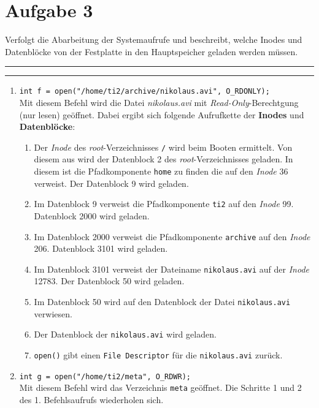 \documentclass{ti2}
\makeatletter
\renewenvironment{quote}{%
  \vskip 10\p@
  \parindent\z@
  \tcolorbox[
    breakable, sharp corners,
    boxrule=\z@, boxsep=\z@,
    left=\z@, right=\z@,
    top=\z@, bottom=\z@,
    colback=sx-yellow
  ]
  {\color{sx-orange}\d@ublerule}
  \vskip 5\p@
  \list{}{\rightmargin\leftmargin}%
  \item\relax
}{%
  \endlist
  {\color{sx-orange}\d@ublerule}
  \endtcolorbox
  \vskip 5\p@
}
\def\d@ublerule{\hrule\@width\hsize\kern 1.5\p@\hrule\@width\hsize}
\makeatother
\begin{document}
\section*{Aufgabe 3}
	\begin{quote}
		Verfolgt die Abarbeitung der Systemaufrufe und beschreibt, welche Inodes und Datenblöcke von
		der Festplatte in den Hauptspeicher geladen werden müssen.
	\end{quote}
	\begin{enumerate}
		\renewcommand{\labelenumii}{\theenumii}
		\renewcommand{\theenumii}{\theenumi.\arabic{enumii}.}
		\setcounter{enumi}{0}
		\item \texttt{int f = open("/home/ti2/archive/nikolaus.avi", O\_RDONLY);}\\
		Mit diesem Befehl wird die Datei \textit{nikolaus.avi} mit \textit{Read-Only}-Berechtgung (nur lesen) geöffnet. Dabei ergibt sich folgende Aufrufkette der \textbf{Inodes} und \textbf{Datenblöcke}:
		\begin{enumerate}
			\item Der \textit{Inode} des \textit{root}-Verzeichnisses \texttt{/} wird beim Booten ermittelt. Von diesem aus wird der Datenblock 2 des \textit{root}-Verzeichnisses geladen. In diesem ist die Pfadkomponente \texttt{home} zu finden die auf den \textit{Inode} 36 verweist. Der Datenblock 9 wird geladen.
			\item Im Datenblock 9 verweist die Pfadkomponente \texttt{ti2} auf den \textit{Inode} 99. Datenblock 2000 wird geladen.
			\item Im Datenblock 2000 verweist die Pfadkomponente \texttt{archive} auf den \textit{Inode} 206. Datenblock 3101 wird geladen.
			\item Im Datenblock 3101 verweist der Dateiname \texttt{nikolaus.avi} auf der \textit{Inode} 12783. Der Datenblock 50 wird geladen.
			\item Im Datenblock 50 wird auf den Datenblock der Datei \texttt{nikolaus.avi} verwiesen.
			\item Der Datenblock der \texttt{nikolaus.avi} wird geladen.
			\item \texttt{open()} gibt einen \texttt{File Descriptor} für die \texttt{nikolaus.avi} zurück.
		\end{enumerate}
		\item \texttt{int g = open("/home/ti2/meta", O\_RDWR);}\\
		Mit diesem Befehl wird das Verzeichnis \texttt{meta} geöffnet. Die Schritte 1 und 2 des 1. Befehlsaufrufs wiederholen sich.
		\begin{enumerate}

\end{enumerate}
\end{enumerate}
\end{document}
